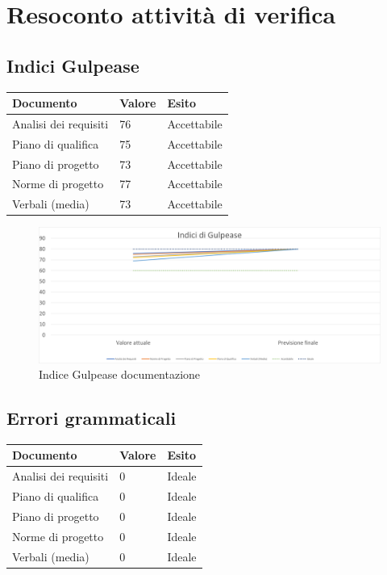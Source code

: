 \chapter{Resoconto attività di verifica}\label{resoconto-attivita-di-verifica}

\section{Indici Gulpease}

\begin{center}
    \begin{xltabular}{\linewidth}{|l|l|l|}
    \hline
    \textbf{Documento} & \textbf{Valore} & \textbf{Esito} \\
    \hline
     Analisi dei requisiti & 76 & Accettabile \\
     Piano di qualifica & 75 & Accettabile \\
     Piano di progetto & 73 & Accettabile \\
     Norme di progetto & 77 & Accettabile \\
     Verbali (media) & 73 & Accettabile \\ 
    \hline

    \end{xltabular}
\end{center}

\begin{figure}
    \includegraphics[width=\linewidth]{contenuti/img/gulpease.png}
    \caption{Indice Gulpease documentazione}
  \end{figure}

\section{Errori grammaticali}

\begin{center}
    \begin{xltabular}{\linewidth}{|l|l|l|}
    \hline
    \textbf{Documento} & \textbf{Valore} & \textbf{Esito} \\
    \hline
     Analisi dei requisiti & 0 & Ideale \\
     Piano di qualifica & 0 & Ideale \\
     Piano di progetto & 0 & Ideale \\
     Norme di progetto & 0 & Ideale \\
     Verbali (media) & 0 & Ideale \\ 
    \hline

    \end{xltabular}
\end{center}